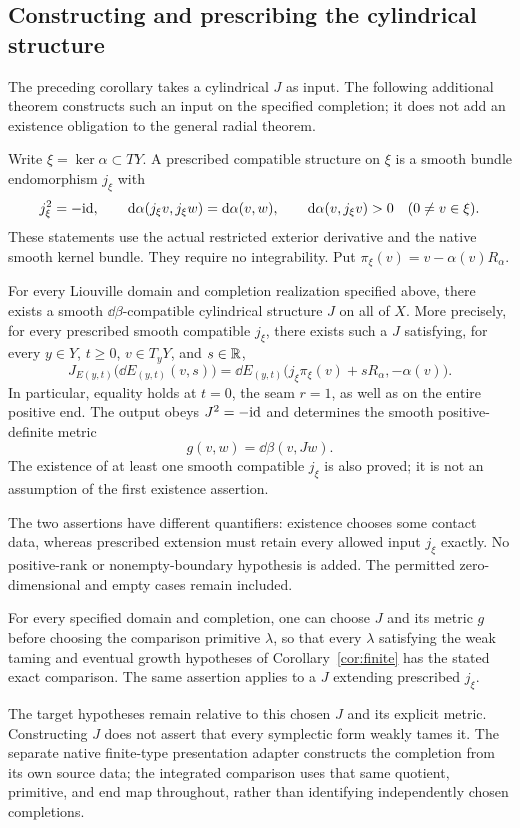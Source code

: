 \subsection{Constructing and prescribing the cylindrical structure}
The preceding corollary takes a cylindrical $J$ as input. The following
additional theorem constructs such an input on the specified completion;
it does not add an existence obligation to the general radial theorem.

Write $\xi=\ker\alpha\subset TY$. A prescribed compatible structure on
$\xi$ is a smooth bundle endomorphism $j_\xi$ with
\[
 j_\xi^2=-\mathrm{id},\qquad
 \mathrm d\alpha(j_\xi v,j_\xi w)=\mathrm d\alpha(v,w),\qquad
 \mathrm d\alpha(v,j_\xi v)>0\quad(0\ne v\in\xi).
\]
These statements use the actual restricted exterior derivative and the
native smooth kernel bundle. They require no integrability.
Put $\pi_\xi(v)=v-\alpha(v)R_\alpha$.

\begin{theorem}
\label{thm:cylindrical}
For every Liouville domain and completion realization specified above,
there exists a smooth $\dd\beta$-compatible cylindrical structure $J$
on all of $X$. More precisely, for every prescribed smooth compatible
$j_\xi$, there exists such a $J$ satisfying, for every $y\in Y$, $t\ge0$,
$v\in T_yY$, and $s\in\mathbb R$,
\begin{equation}\label{eq:prescribed-end}
 J_{E(y,t)}\bigl(\dd E_{(y,t)}(v,s)\bigr)
 =\dd E_{(y,t)}\bigl(j_\xi\pi_\xi(v)+sR_\alpha,
                         -\alpha(v)\bigr).
\end{equation}
In particular, equality holds at $t=0$, the seam $r=1$, as well as on
the entire positive end. The output obeys $J^2=-\mathrm{id}$ and determines
the smooth positive-definite metric
\[
 g(v,w)=\dd\beta(v,Jw).
\]
The existence of at least one smooth compatible $j_\xi$ is also proved;
it is not an assumption of the first existence assertion.
\end{theorem}

The two assertions have different quantifiers: existence chooses some
contact data, whereas prescribed extension must retain every allowed
input $j_\xi$ exactly. No positive-rank or nonempty-boundary hypothesis
is added. The permitted zero-dimensional and empty cases remain included.

\begin{corollary}
For every specified domain and completion, one can choose $J$ and its
metric $g$ before choosing the comparison primitive $\lambda$, so that
every $\lambda$ satisfying the weak taming and eventual growth
hypotheses of Corollary~\ref{cor:finite} has the stated exact comparison.
The same assertion applies to a $J$ extending prescribed $j_\xi$.
\end{corollary}
The target hypotheses remain relative to this chosen $J$ and its
explicit metric. Constructing $J$ does not assert that every symplectic
form weakly tames it. The separate native finite-type presentation
adapter constructs the completion from its own source data; the
integrated comparison uses that same quotient, primitive, and end map
throughout, rather than identifying independently chosen completions.

